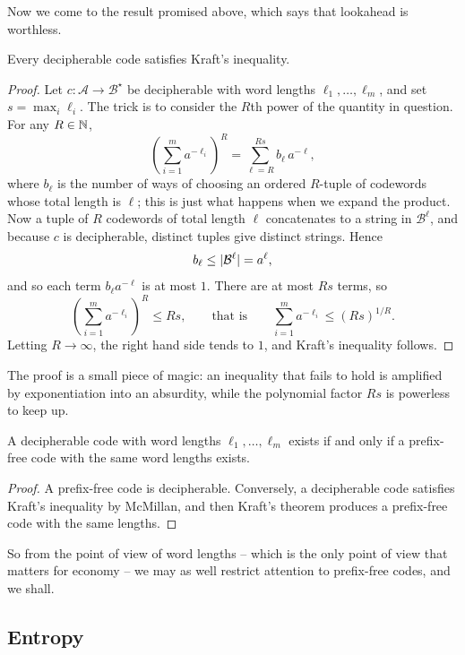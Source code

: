 \documentclass[a4paper]{scrartcl}
\newcommand{\Ac}{\mathcal{A}}
\newcommand{\Bc}{\mathcal{B}}
\begin{document}
Now we come to the result promised above, which says that lookahead is worthless.

\begin{theorem}[McMillan]
	Every decipherable code satisfies Kraft's inequality.
\end{theorem}

\begin{proof}
	Let $c \colon \Ac \to \Bc^\star$ be decipherable with word lengths $\ell_1, \dots, \ell_m$, and set $s = \max_i \ell_i$. The trick is to consider the $R$th power of the quantity in question. For any $R \in \mathbb{N}$,
	$$\left(\sum_{i=1}^m a^{-\ell_i}\right)^{\!R} = \sum_{\ell=R}^{Rs} b_\ell\, a^{-\ell},$$
	where $b_\ell$ is the number of ways of choosing an ordered $R$-tuple of codewords whose total length is $\ell$; this is just what happens when we expand the product. Now a tuple of $R$ codewords of total length $\ell$ concatenates to a string in $\Bc^\ell$, and because $c$ is decipherable, distinct tuples give distinct strings. Hence
	$$b_\ell \le \abs{\Bc^\ell} = a^\ell,$$
	and so each term $b_\ell a^{-\ell}$ is at most $1$. There are at most $Rs$ terms, so
	$$\left(\sum_{i=1}^m a^{-\ell_i}\right)^{\!R} \le Rs, \qquad \text{that is} \qquad \sum_{i=1}^m a^{-\ell_i} \le (Rs)^{1/R}.$$
	Letting $R \to \infty$, the right hand side tends to $1$, and Kraft's inequality follows.
\end{proof}

The proof is a small piece of magic: an inequality that fails to hold is amplified by exponentiation into an absurdity, while the polynomial factor $Rs$ is powerless to keep up.

\begin{corollary}
	A decipherable code with word lengths $\ell_1, \dots, \ell_m$ exists if and only if a prefix-free code with the same word lengths exists.
\end{corollary}

\begin{proof}
	A prefix-free code is decipherable. Conversely, a decipherable code satisfies Kraft's inequality by McMillan, and then Kraft's theorem produces a prefix-free code with the same lengths.
\end{proof}

So from the point of view of word lengths -- which is the only point of view that matters for economy -- we may as well restrict attention to prefix-free codes, and we shall.

\subsection{Entropy}
\end{document}
